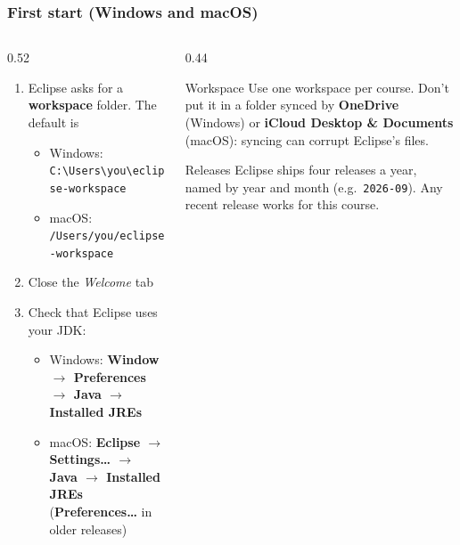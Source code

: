 \documentclass[aspectratio=169,10pt,compress]{beamer}
\newcommand{\menu}[1]{\textsf{\textbf{#1}}}                      %
\begin{document}
\begin{frame}[t,fragile] \frametitle{First start (Windows and macOS)}
  \begin{columns}[T]
    \begin{column}{0.52\textwidth}
      \begin{enumerate}\small
        \item Eclipse asks for a \textbf{workspace} folder. The default is
              \begin{itemize}
                \item Windows: \texttt{C:\textbackslash Users\textbackslash you\textbackslash eclipse-workspace}
                \item macOS: \texttt{/Users/you/eclipse-workspace}
              \end{itemize}
        \item Close the \emph{Welcome} tab
        \item Check that Eclipse uses your JDK:
              \begin{itemize}
                \item Windows: \menu{Window $\rightarrow$ Preferences $\rightarrow$ Java $\rightarrow$ Installed JREs}
                \item macOS: \menu{Eclipse $\rightarrow$ Settings\dots{} $\rightarrow$ Java $\rightarrow$ Installed JREs}
                      (\menu{Preferences\dots} in older releases)
              \end{itemize}
      \end{enumerate}
    \end{column}
    \begin{column}{0.44\textwidth}
      \begin{alertblock}{Workspace}
        \small Use one workspace per course. Don't put it in a folder synced by
        \textbf{OneDrive} (Windows) or \textbf{iCloud Desktop \& Documents} (macOS):
        syncing can corrupt Eclipse's files.
      \end{alertblock}
      \begin{block}{Releases}
        \small Eclipse ships four releases a year, named by year and month
        (e.g.\ \texttt{2026-09}). Any recent release works for this course.
      \end{block}
    \end{column}
  \end{columns}
\end{frame}
\end{document}
